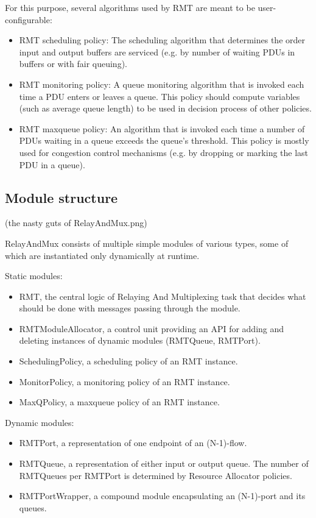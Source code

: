             For this purpose, several algorithms used by RMT are meant to be user-configurable:

            \begin{itemize}
                \item RMT scheduling policy: The scheduling algorithm that determines the order input and output buffers are serviced (e.g. by number of waiting PDUs in buffers or with fair queuing).
                \item RMT monitoring policy: A queue monitoring algorithm that is invoked each time a PDU enters or leaves a queue. This policy should compute variables (such as average queue length) to be used in decision process of other policies.
                \item RMT maxqueue policy: An algorithm that is invoked each time a number of PDUs waiting in a queue exceeds the queue's threshold. This policy is mostly used for congestion control mechanisms (e.g. by dropping or marking the last PDU in a queue).
            \end{itemize}

        \subsection{Module structure}

            (the nasty guts of RelayAndMux.png)

            RelayAndMux consists of multiple simple modules of various types, some of which are instantiated only dynamically at runtime.

            Static modules:
            \begin{itemize}
                \item RMT, the central logic of Relaying And Multiplexing task that decides what should be done with messages passing through the module.
                \item RMTModuleAllocator, a control unit providing an API for adding and deleting instances of dynamic modules (RMTQueue, RMTPort).
                \item SchedulingPolicy, a scheduling policy of an RMT instance.
                \item MonitorPolicy, a monitoring policy of an RMT instance.
                \item MaxQPolicy, a maxqueue policy of an RMT instance.
            \end{itemize}

            Dynamic modules:
            \begin{itemize}
                \item RMTPort, a representation of one endpoint of an (N-1)-flow.
                \item RMTQueue, a representation of either input or output queue. The number of RMTQueues per RMTPort is determined by Resource Allocator policies.
                \item RMTPortWrapper, a compound module encapsulating an (N-1)-port and its queues.
            \end{itemize}

